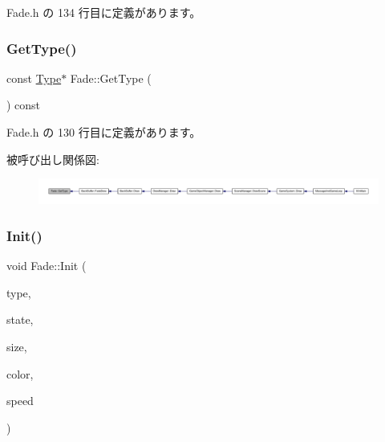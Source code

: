  Fade.\+h の 134 行目に定義があります。

\mbox{\label{class_fade_aed5a29d39a5fd6161a9aed73d5f30870}} 
\subsubsection{\texorpdfstring{Get\+Type()}{GetType()}}
{\footnotesize\ttfamily const \mbox{\hyperlink{class_fade_ac06f27215b454aa05b93c236476d6e80}{Type}}$\ast$ Fade\+::\+Get\+Type (\begin{DoxyParamCaption}{ }\end{DoxyParamCaption}) const\hspace{0.3cm}{\ttfamily [inline]}}



 Fade.\+h の 130 行目に定義があります。

被呼び出し関係図\+:
\nopagebreak
\begin{figure}[H]
\begin{center}
\leavevmode
\includegraphics[width=350pt]{class_fade_aed5a29d39a5fd6161a9aed73d5f30870_icgraph}
\end{center}
\end{figure}
\mbox{\label{class_fade_aab12848f7102a219968c86ed699a6e5d}} 
\subsubsection{\texorpdfstring{Init()}{Init()}}
{\footnotesize\ttfamily void Fade\+::\+Init (\begin{DoxyParamCaption}\item[{\mbox{\hyperlink{class_fade_ac06f27215b454aa05b93c236476d6e80}{Type}}}]{type,  }\item[{\mbox{\hyperlink{class_fade_ae77826bf3ff2ab95fb7b3b6f95cba80a}{State}}}]{state,  }\item[{\mbox{\hyperlink{_vector3_d_8h_a5ef6e95dfc5f9d3820b71772d99bbc25}{Vec2}}}]{size,  }\item[{\mbox{\hyperlink{_vector3_d_8h_a680c30c4a07d86fe763c7e01169cd6cc}{X\+Color4}}}]{color,  }\item[{float}]{speed }\end{DoxyParamCaption})}



